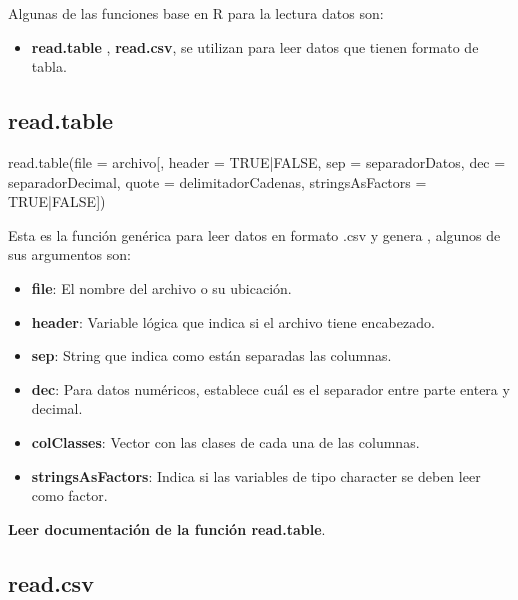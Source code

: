 \documentclass[
  12pt,
]{book}
\newenvironment{Shaded}{\begin{snugshade}}{\end{snugshade}}
\newcommand{\AttributeTok}[1]{\textcolor[rgb]{0.77,0.63,0.00}{#1}}
\newcommand{\ConstantTok}[1]{\textcolor[rgb]{0.00,0.00,0.00}{#1}}
\newcommand{\FunctionTok}[1]{\textcolor[rgb]{0.00,0.00,0.00}{#1}}
\newcommand{\NormalTok}[1]{#1}
\newcommand{\SpecialCharTok}[1]{\textcolor[rgb]{0.00,0.00,0.00}{#1}}
\providecommand{\tightlist}{%
  \setlength{\itemsep}{0pt}\setlength{\parskip}{0pt}}
\begin{document}
Algunas de las funciones base en R para la lectura datos son:

\begin{itemize}
\tightlist
\item
  \textbf{read.table} , \textbf{read.csv}, se utilizan para leer datos que tienen formato de tabla.
\end{itemize}

\hypertarget{read.table}{%
\subsection{\texorpdfstring{\textbf{read.table}}{read.table}}\label{read.table}}

\begin{Shaded}
\begin{Highlighting}[]
 \FunctionTok{read.table}\NormalTok{(}\AttributeTok{file =}\NormalTok{ archivo[, }\AttributeTok{header =} \ConstantTok{TRUE}\SpecialCharTok{|}\ConstantTok{FALSE}\NormalTok{,}
\AttributeTok{sep =}\NormalTok{ separadorDatos, }\AttributeTok{dec =}\NormalTok{ separadorDecimal,}
\AttributeTok{quote =}\NormalTok{ delimitadorCadenas,}
\AttributeTok{stringsAsFactors =} \ConstantTok{TRUE}\SpecialCharTok{|}\ConstantTok{FALSE}\NormalTok{])}
\end{Highlighting}
\end{Shaded}

Esta es la función genérica para leer datos en formato .csv y genera , algunos de sus argumentos son:

\begin{itemize}
\tightlist
\item
  \textbf{file}: El nombre del archivo o su ubicación.
\item
  \textbf{header}: Variable lógica que indica si el archivo tiene encabezado.
\item
  \textbf{sep}: String que indica como están separadas las columnas.
\item
  \textbf{dec}: Para datos numéricos, establece cuál es el separador entre parte entera
  y decimal.
\item
  \textbf{colClasses}: Vector con las clases de cada una de las columnas.
\item
  \textbf{stringsAsFactors}: Indica si las variables de tipo character se deben leer como factor.
\end{itemize}

\textbf{Leer documentación de la función read.table}.

\hypertarget{read.csv}{%
\subsection{\texorpdfstring{\textbf{read.csv}}{read.csv}}\label{read.csv}}
\end{document}
